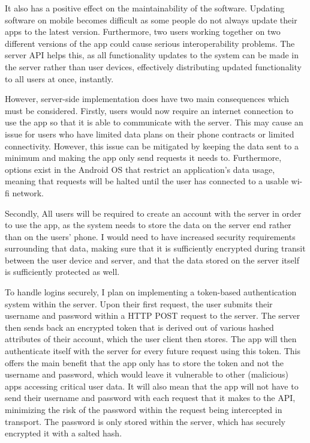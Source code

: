 It also has a positive effect on the maintainability of the software. 
Updating software on mobile becomes difficult as some people do not always update their apps to the latest version. 
Furthermore, two users working together on two different versions of the app could cause serious interoperability problems.
The server API helps this, as all functionality updates to the system can be made in the server rather than user devices, effectively distributing updated functionality to all users at once, instantly.

However, server-side implementation does have two main consequences which must be considered. 
Firstly, users would now require an internet connection to use the app so that it is able to communicate with the server.
This may cause an issue for users who have limited data plans on their phone contracts or limited connectivity. 
However, this issue can be mitigated by keeping the data sent to a minimum and making the app only send requests it needs to.
Furthermore, options exist in the Android OS that restrict an application's data usage, meaning that requests will be halted until the user has connected to a usable wi-fi network.

Secondly, All users will be required to create an account with the server in order to use the app, as the system needs to store the data on the server end rather than on the users' phone.
I would need to have increased security requirements surrounding that data, making sure that it is sufficiently encrypted during transit between the user device and server, and that the data stored on the server itself is sufficiently protected as well.

To handle logins securely, I plan on implementing a token-based authentication system within the server. 
Upon their first request, the user submits their username and password within a HTTP POST request to the server.
The server then sends back an encrypted token that is derived out of various hashed attributes of their account, which the user client then stores.
The app will then authenticate itself with the server for every future request using this token.
This offers the main benefit that the app only has to store the token and not the username and password, which would leave it vulnerable to other (malicious) apps accessing critical user data.
It will also mean that the app will not have to send their username and password with each request that it makes to the API, minimizing the risk of the password within the request being intercepted in transport.
The password is only stored within the server, which has securely encrypted it with a salted hash.


